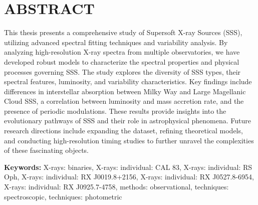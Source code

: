 
\chapter*{ABSTRACT}
    
    This thesis presents a comprehensive study of Supersoft X-ray Sources (SSS), utilizing advanced spectral fitting techniques and variability analysis. By analyzing high-resolution X-ray spectra from multiple observatories, we have developed robust models to characterize the spectral properties and physical processes governing SSS. The study explores the diversity of SSS types, their spectral features, luminosity, and variability characteristics. Key findings include differences in interstellar absorption between Milky Way and Large Magellanic Cloud SSS, a correlation between luminosity and mass accretion rate, and the presence of periodic modulations. These results provide insights into the evolutionary pathways of SSS and their role in astrophysical phenomena. Future research directions include expanding the dataset, refining theoretical models, and conducting high-resolution timing studies to further unravel the complexities of these fascinating objects.
    
    \textbf{Keywords:} X-rays: binaries, X-rays: individual: CAL 83, X-rays: individual: RS Oph, X-rays: individual: RX J0019.8+2156, X-rays: individual: RX J0527.8-6954, X-rays: individual: RX J0925.7-4758, methods: observational, techniques: spectroscopic, techniques: photometric

